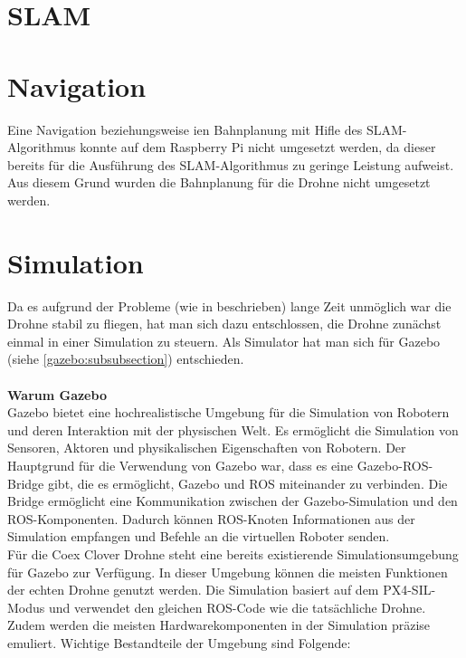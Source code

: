 \section{SLAM} \label{slam:section}
\section{Navigation} \label{navigation:section} 
Eine Navigation beziehungsweise ien Bahnplanung mit Hifle des \ac{SLAM}-Algorithmus konnte auf dem Raspberry Pi nicht umgesetzt werden, da dieser bereits für die Ausführung des \ac{SLAM}-Algorithmus zu geringe Leistung aufweist. Aus diesem Grund wurden die Bahnplanung für die Drohne nicht umgesetzt werden.



\section{Simulation} \label{simulation:section}
Da es aufgrund der Probleme (wie in  beschrieben) lange Zeit unmöglich war die Drohne stabil zu fliegen, hat man  sich dazu entschlossen, die Drohne zunächst einmal in einer Simulation zu steuern. Als Simulator hat man sich für Gazebo (siehe \ref{gazebo:subsubsection}) entschieden. \\
\\
\textbf{Warum Gazebo} \\
Gazebo bietet eine hochrealistische Umgebung für die Simulation von Robotern und deren Interaktion mit der physischen Welt. Es ermöglicht die Simulation von Sensoren, Aktoren und physikalischen Eigenschaften von Robotern. Der Hauptgrund für die Verwendung von Gazebo war, dass es eine Gazebo-ROS-Bridge gibt, die es ermöglicht, Gazebo und ROS miteinander zu verbinden. Die Bridge ermöglicht eine Kommunikation zwischen der Gazebo-Simulation und den ROS-Komponenten. Dadurch können ROS-Knoten Informationen aus der Simulation empfangen und Befehle an die virtuellen Roboter senden. \\

Für die Coex Clover Drohne steht eine bereits existierende Simulationsumgebung für Gazebo zur Verfügung. In dieser Umgebung können die meisten Funktionen der echten Drohne genutzt werden. Die Simulation basiert auf dem PX4-SIL-Modus und verwendet den gleichen ROS-Code wie die tatsächliche Drohne. Zudem werden die meisten Hardwarekomponenten in der Simulation präzise emuliert. Wichtige Bestandteile der Umgebung sind Folgende:

